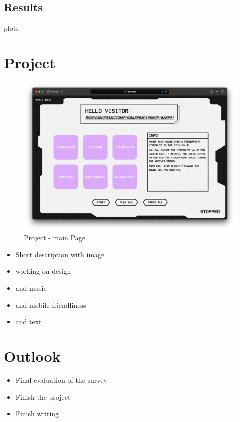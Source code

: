 \documentclass[12pt]{article}
\begin{document}
\subsection*{Results}
plots

\section*{Project}

\begin{figure}[h!]
  \includegraphics[width=\linewidth]{../public/img/fingerprint-sound.png}
  \caption{Project - main Page}
  \label{img:project-main}
\end{figure}

\begin{itemize}
  \item Short description with image
  \item working on design
  \item and music
  \item and mobile friendliness
  \item and text
\end{itemize}

\section*{Outlook}
\begin{itemize}
  \item Final evaluation of the survey
  \item Finish the project
  \item Finish writing
\end{itemize}

\printbibliography
\end{document}
